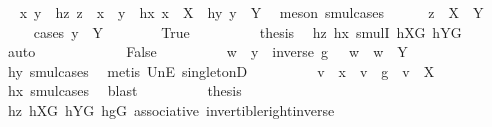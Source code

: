 \begin{isabellebody}
\ \isamarkupfalse%
\ x\ y\ \ hz{\isacharcolon}{\kern0pt}\ {\isachardoublequoteopen}z\ {\isacharequal}{\kern0pt}\ x\ {\isasymcdot}\ y{\isachardoublequoteclose}\ \ hx{\isacharcolon}{\kern0pt}\ {\isachardoublequoteopen}x\ {\isasymin}\ {\isacharquery}{\kern0pt}X{}{\isachardoublequoteclose}\ \ hy{\isacharcolon}{\kern0pt}\ {\isachardoublequoteopen}y\ {\isasymin}\ {\isacharquery}{\kern0pt}Y{}{\isachardoublequoteclose}\ \isamarkupfalse%
\ {\isacharparenleft}{\kern0pt}meson\ smul{\isachardot}{\kern0pt}cases{\isacharparenright}{\kern0pt}\isanewline
\ \ \ \ \isamarkupfalse%
\ {\isachardoublequoteopen}z\ {\isasymin}\ X\ {\isasymcdots}\ Y{\isachardoublequoteclose}\isanewline
\ \ \ \ \isamarkupfalse%
{\isacharparenleft}{\kern0pt}cases\ {\isachardoublequoteopen}y\ {\isasymin}\ Y{\isachardoublequoteclose}{\isacharparenright}{\kern0pt}\isanewline
\ \ \ \ \ \ \isamarkupfalse%
\ True\isanewline
\ \ \ \ \ \ \isamarkupfalse%
\ \isamarkupfalse%
\ {\isacharquery}{\kern0pt}thesis\ \isamarkupfalse%
\ hz\ hx\ smulI\ hXG\ hYG\ \isamarkupfalse%
\ auto\isanewline
\ \ \ \ \isamarkupfalse%
\isanewline
\ \ \ \ \ \ \isamarkupfalse%
\ False\isanewline
\ \ \ \ \ \ \isamarkupfalse%
\ \isamarkupfalse%
\ w\ \ {\isachardoublequoteopen}y\ {\isacharequal}{\kern0pt}\ inverse\ g\ {\isasymcdot}\ \ w{\isachardoublequoteclose}\ \ {\isachardoublequoteopen}w\ {\isasymin}\ Y{\isachardoublequoteclose}\ \isamarkupfalse%
\ hy\ smul{\isachardot}{\kern0pt}cases\ \isamarkupfalse%
\ {\isacharparenleft}{\kern0pt}metis\ UnE\ singletonD{\isacharparenright}{\kern0pt}\isanewline
\ \ \ \ \ \ \isamarkupfalse%
\ \isamarkupfalse%
\ v\ \ {\isachardoublequoteopen}x\ {\isacharequal}{\kern0pt}\ v\ {\isasymcdot}\ g{\isachardoublequoteclose}\ \ {\isachardoublequoteopen}v\ {\isasymin}\ X{\isachardoublequoteclose}\ \isamarkupfalse%
\ hx\ smul{\isachardot}{\kern0pt}cases\ \isamarkupfalse%
\ blast\isanewline
\ \ \ \ \ \ \isamarkupfalse%
\ \isamarkupfalse%
\ {\isacharquery}{\kern0pt}thesis\ \isamarkupfalse%
\ hz\ hXG\ hYG\ hgG\ associative\ invertible{\isacharunderscore}{\kern0pt}right{\isacharunderscore}{\kern0pt}inverse{}\isanewline

\end{isabellebody}
